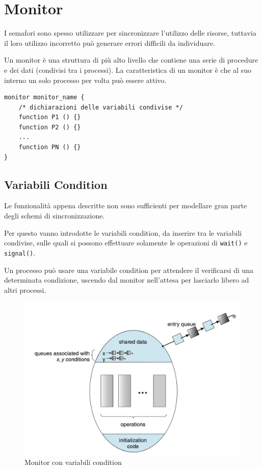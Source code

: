 \section{Monitor}
I semafori sono spesso utilizzare per sincronizzare l'utilizzo delle risorse, tuttavia il loro utilizzo incorretto può generare errori difficili da individuare.

\spacer
Un monitor è una struttura di più alto livello che contiene una serie di procedure e dei dati (condivisi tra i processi).
La caratteristica di un monitor è che al suo interno un solo processo per volta può essere attivo.

\begin{verbatim}
monitor monitor_name {
    /* dichiarazioni delle variabili condivise */
    function P1 () {}
    function P2 () {}
    ...
    function PN () {}
}
\end{verbatim}

\subsection{Variabili Condition}
Le funzionalità appena descritte non sono sufficienti per modellare gran parte degli schemi di sincronizzazione.

Per questo vanno introdotte le variabili condition, da inserire tra le variabili condivise, sulle quali si possono effettuare solamente le operazioni di \texttt{wait()} e \texttt{signal()}.

Un processo può usare una variabile condition per attendere il verificarsi di una determinata condizione, uscendo dal monitor nell'attesa per lasciarlo libero ad altri processi.

\begin{figure}[H]
    \centering
    \includegraphics[width=0.6\linewidth]{assets/monitor.jpg}
    \caption{Monitor con variabili condition}
\end{figure}

